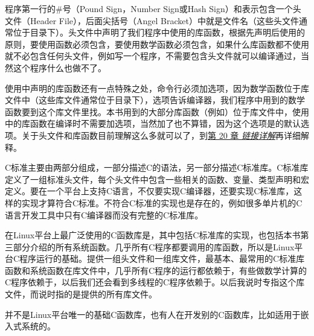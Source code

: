 程序第一行的\#号（Pound Sign，Number Sign或Hash Sign）和表示包含一个头文件（Header File），后面尖括号（Angel Bracket）中就是文件名（这些头文件通常位于目录下）。头文件中声明了我们程序中使用的库函数，根据先声明后使用的原则，要使用函数必须包含，要使用数学函数必须包含，如果什么库函数都不使用就不必包含任何头文件，例如写一个程序，不需要包含头文件就可以编译通过，当然这个程序什么也做不了。



使用中声明的库函数还有一点特殊之处，命令行必须加选项，因为数学函数位于库文件中（这些库文件通常位于目录下），选项告诉编译器，我们程序中用到的数学函数要到这个库文件里找。本书用到的大部分库函数（例如）位于库文件中，使用中的库函数在编译时不需要加选项，当然加了也不算错，因为这个选项是的默认选项。关于头文件和库函数目前理解这么多就可以了，到\hyperlink{db.ch20.id2786782}{第 20 章 \emph{链接详解}}再详细解释。


\begin{BookNote}


C标准主要由两部分组成，一部分描述C的语法，另一部分描述C标准库。C标准库定义了一组标准头文件，每个头文件中包含一些相关的函数、变量、类型声明和宏定义。要在一个平台上支持C语言，不仅要实现C编译器，还要实现C标准库，这样的实现才算符合C标准。不符合C标准的实现也是存在的，例如很多单片机的C语言开发工具中只有C编译器而没有完整的C标准库。



在Linux平台上最广泛使用的C函数库是，其中包括C标准库的实现，也包括本书第三部分介绍的所有系统函数。几乎所有C程序都要调用的库函数，所以是Linux平台C程序运行的基础。提供一组头文件和一组库文件，最基本、最常用的C标准库函数和系统函数在库文件中，几乎所有C程序的运行都依赖于，有些做数学计算的C程序依赖于，以后我们还会看到多线程的C程序依赖于。以后我说时专指这个库文件，而说时指的是提供的所有库文件。



并不是Linux平台唯一的基础C函数库，也有人在开发别的C函数库，比如适用于嵌入式系统的。

\end{BookNote}

